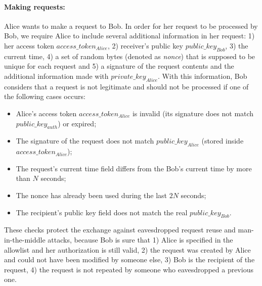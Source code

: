 \paragraph{Making requests:} Alice wants to make a request to Bob. In order for her request to be processed by Bob, we require Alice to include several additional information in her request: 1) her access token $access\_token_{Alice}$, 2) receiver's public key $public\_key_{Bob}$, 3) the current time, 4) a set of random bytes (denoted as \textit{nonce}) that is supposed to be unique for each request and 5) a signature of the request contents and the additional information made with $private\_key_{Alice}$. With this information, Bob considers that a request is not legitimate and should not be processed if one of the following cases occurs:
\begin{itemize}[leftmargin=*]
    \item Alice's access token $access\_token_{Alice}$ is invalid (its signature does not match $public\_key_{auth}$) or expired;
    \item The signature of the request does not match $public\_key_{Alice}$ (stored inside $access\_token_{Alice}$);
    \item The request's current time field differs from the Bob's current time by more than $N$ seconds;
    \item The nonce has already been used during the last $2N$ seconds;
    \item The recipient's public key field does not match the real $public\_key_{Bob}$.
\end{itemize}
These checks protect the exchange against eavesdropped request reuse and man-in-the-middle attacks, because Bob is sure that 1) Alice is specified in the allowlist and her authorization is still valid, 2) the request was created by Alice and could not have been modified by someone else, 3) Bob is the recipient of the request, 4) the request is not repeated by someone who eavesdropped a previous one.
